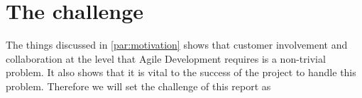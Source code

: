 \section{The challenge}\label{subsec:theChallenge}
The things discussed in \autoref{par:motivation} shows that customer involvement and collaboration at the level that Agile Development requires is a non-trivial problem. It also shows that it is vital to the success of the project to handle this problem. Therefore we will set the challenge of this report as \\
\noindent\hrulefill\par
\noindent{} \\
\\
\noindent\hrulefill\par
\noindent{} \\

